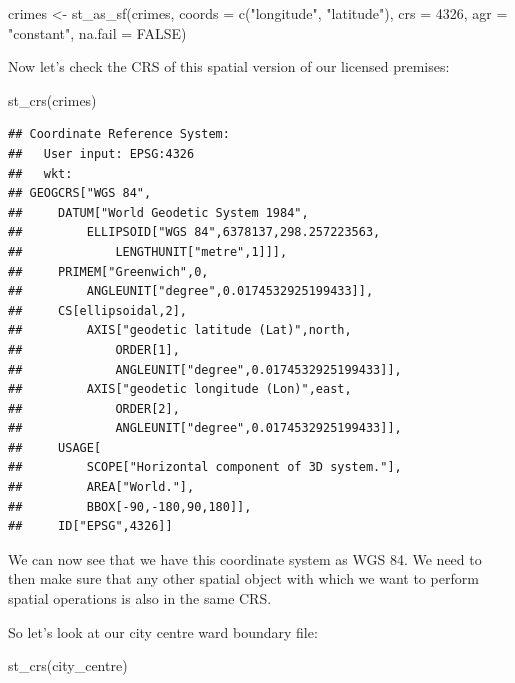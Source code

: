 \documentclass[
  krantz2]{krantz}
\makeatletter
\newenvironment{Shaded}{\begin{snugshade}}{\end{snugshade}}
\newcommand{\AttributeTok}[1]{\textcolor[rgb]{0.61,0.61,0.61}{#1}}
\newcommand{\ConstantTok}[1]{\textcolor[rgb]{0,0,0}{#1}}
\newcommand{\DecValTok}[1]{\textcolor[rgb]{0.06,0.06,0.06}{#1}}
\newcommand{\FunctionTok}[1]{\textcolor[rgb]{0,0,0}{#1}}
\newcommand{\NormalTok}[1]{#1}
\newcommand{\OtherTok}[1]{\textcolor[rgb]{0.37,0.37,0.37}{#1}}
\newcommand{\StringTok}[1]{\textcolor[rgb]{0.5,0.5,0.5}{#1}}
\newenvironment{kframe}{%
\medskip{}
\setlength{\fboxsep}{.8em}
 \def\at@end@of@kframe{}%
 \ifinner\ifhmode%
  \def\at@end@of@kframe{\end{minipage}}%
  \begin{minipage}{\columnwidth}%
 \fi\fi%
 \def\FrameCommand##1{\hskip\@totalleftmargin \hskip-\fboxsep
 \colorbox{shadecolor}{##1}\hskip-\fboxsep
     \hskip-\linewidth \hskip-\@totalleftmargin \hskip\columnwidth}%
 \MakeFramed {\advance\hsize-\width
   \@totalleftmargin\z@ \linewidth\hsize
   \@setminipage}}%
 {\par\unskip\endMakeFramed%
 \at@end@of@kframe}
\renewenvironment{Shaded}{\begin{kframe}}{\end{kframe}}
\makeatother
\begin{document}
\begin{Shaded}
\begin{Highlighting}[]
\NormalTok{crimes }\OtherTok{\textless{}{-}} \FunctionTok{st\_as\_sf}\NormalTok{(crimes, }\AttributeTok{coords =} \FunctionTok{c}\NormalTok{(}\StringTok{"longitude"}\NormalTok{, }\StringTok{"latitude"}\NormalTok{), }
                 \AttributeTok{crs =} \DecValTok{4326}\NormalTok{, }\AttributeTok{agr =} \StringTok{"constant"}\NormalTok{, }\AttributeTok{na.fail =} \ConstantTok{FALSE}\NormalTok{)}
\end{Highlighting}
\end{Shaded}

Now let's check the CRS of this spatial version of our licensed premises:

\begin{Shaded}
\begin{Highlighting}[]
\FunctionTok{st\_crs}\NormalTok{(crimes)}
\end{Highlighting}
\end{Shaded}

\begin{verbatim}
## Coordinate Reference System:
##   User input: EPSG:4326 
##   wkt:
## GEOGCRS["WGS 84",
##     DATUM["World Geodetic System 1984",
##         ELLIPSOID["WGS 84",6378137,298.257223563,
##             LENGTHUNIT["metre",1]]],
##     PRIMEM["Greenwich",0,
##         ANGLEUNIT["degree",0.0174532925199433]],
##     CS[ellipsoidal,2],
##         AXIS["geodetic latitude (Lat)",north,
##             ORDER[1],
##             ANGLEUNIT["degree",0.0174532925199433]],
##         AXIS["geodetic longitude (Lon)",east,
##             ORDER[2],
##             ANGLEUNIT["degree",0.0174532925199433]],
##     USAGE[
##         SCOPE["Horizontal component of 3D system."],
##         AREA["World."],
##         BBOX[-90,-180,90,180]],
##     ID["EPSG",4326]]
\end{verbatim}

We can now see that we have this coordinate system as WGS 84. We need to then make sure that any other spatial object with which we want to perform spatial operations is also in the same CRS.

So let's look at our city centre ward boundary file:

\begin{Shaded}
\begin{Highlighting}[]
\FunctionTok{st\_crs}\NormalTok{(city\_centre)}
\end{Highlighting}
\end{Shaded}
\end{document}
